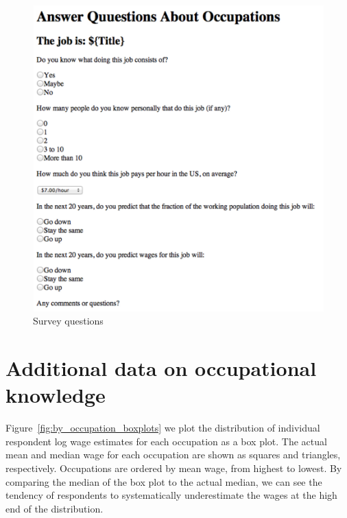 \documentclass[12pt]{article}
\begin{document}
\begin{figure}
\centering
\caption{Survey questions \label{fig:survey}}
\begin{minipage}{0.75 \linewidth}
\includegraphics[width = \linewidth]{./images/survey.png}
\end{minipage}  
\end{figure} 

\section{Additional data on occupational knowledge} \label{sec:additional}

Figure~\ref{fig:by_occupation_boxplots} we plot the distribution of individual respondent log wage estimates for each occupation as a box plot. 
The actual mean and median wage for each occupation are shown as squares and triangles, respectively. 
Occupations are ordered by mean wage, from highest to lowest. 
By comparing the median of the box plot to the actual median, we can see the tendency of respondents to systematically underestimate the wages at the high end of the distribution. 
\end{document}
